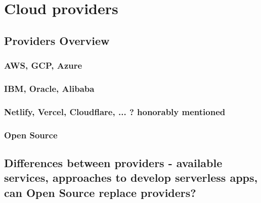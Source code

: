 \chapter{Cloud providers}

\section*{Providers Overview}

\subsection*{AWS, GCP, Azure}

\subsection*{IBM, Oracle, Alibaba}

\subsection*{Netlify, Vercel, Cloudflare, ... ? honorably mentioned}

\subsection*{Open Source}

\section*{Differences between providers - available services, approaches to develop serverless apps, can Open Source replace providers?}